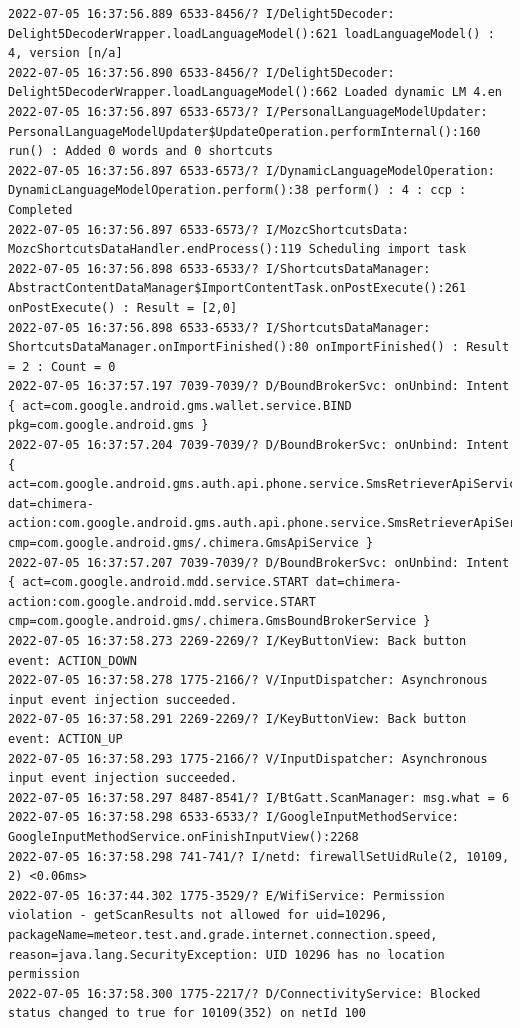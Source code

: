 \documentclass[a4paper,12pt]{book}
\begin{document}
\begin{lstlisting}
2022-07-05 16:37:56.889 6533-8456/? I/Delight5Decoder: Delight5DecoderWrapper.loadLanguageModel():621 loadLanguageModel() : 4, version [n/a]
2022-07-05 16:37:56.890 6533-8456/? I/Delight5Decoder: Delight5DecoderWrapper.loadLanguageModel():662 Loaded dynamic LM 4.en
2022-07-05 16:37:56.897 6533-6573/? I/PersonalLanguageModelUpdater: PersonalLanguageModelUpdater$UpdateOperation.performInternal():160 run() : Added 0 words and 0 shortcuts
2022-07-05 16:37:56.897 6533-6573/? I/DynamicLanguageModelOperation: DynamicLanguageModelOperation.perform():38 perform() : 4 : ccp : Completed
2022-07-05 16:37:56.897 6533-6573/? I/MozcShortcutsData: MozcShortcutsDataHandler.endProcess():119 Scheduling import task
2022-07-05 16:37:56.898 6533-6533/? I/ShortcutsDataManager: AbstractContentDataManager$ImportContentTask.onPostExecute():261 onPostExecute() : Result = [2,0]
2022-07-05 16:37:56.898 6533-6533/? I/ShortcutsDataManager: ShortcutsDataManager.onImportFinished():80 onImportFinished() : Result = 2 : Count = 0
2022-07-05 16:37:57.197 7039-7039/? D/BoundBrokerSvc: onUnbind: Intent { act=com.google.android.gms.wallet.service.BIND pkg=com.google.android.gms }
2022-07-05 16:37:57.204 7039-7039/? D/BoundBrokerSvc: onUnbind: Intent { act=com.google.android.gms.auth.api.phone.service.SmsRetrieverApiService.START dat=chimera-action:com.google.android.gms.auth.api.phone.service.SmsRetrieverApiService.START cmp=com.google.android.gms/.chimera.GmsApiService }
2022-07-05 16:37:57.207 7039-7039/? D/BoundBrokerSvc: onUnbind: Intent { act=com.google.android.mdd.service.START dat=chimera-action:com.google.android.mdd.service.START cmp=com.google.android.gms/.chimera.GmsBoundBrokerService }
2022-07-05 16:37:58.273 2269-2269/? I/KeyButtonView: Back button event: ACTION_DOWN
2022-07-05 16:37:58.278 1775-2166/? V/InputDispatcher: Asynchronous input event injection succeeded.
2022-07-05 16:37:58.291 2269-2269/? I/KeyButtonView: Back button event: ACTION_UP
2022-07-05 16:37:58.293 1775-2166/? V/InputDispatcher: Asynchronous input event injection succeeded.
2022-07-05 16:37:58.297 8487-8541/? I/BtGatt.ScanManager: msg.what = 6
2022-07-05 16:37:58.298 6533-6533/? I/GoogleInputMethodService: GoogleInputMethodService.onFinishInputView():2268 
2022-07-05 16:37:58.298 741-741/? I/netd: firewallSetUidRule(2, 10109, 2) <0.06ms>
2022-07-05 16:37:44.302 1775-3529/? E/WifiService: Permission violation - getScanResults not allowed for uid=10296, packageName=meteor.test.and.grade.internet.connection.speed, reason=java.lang.SecurityException: UID 10296 has no location permission
2022-07-05 16:37:58.300 1775-2217/? D/ConnectivityService: Blocked status changed to true for 10109(352) on netId 100

\end{lstlisting}
\end{document}
